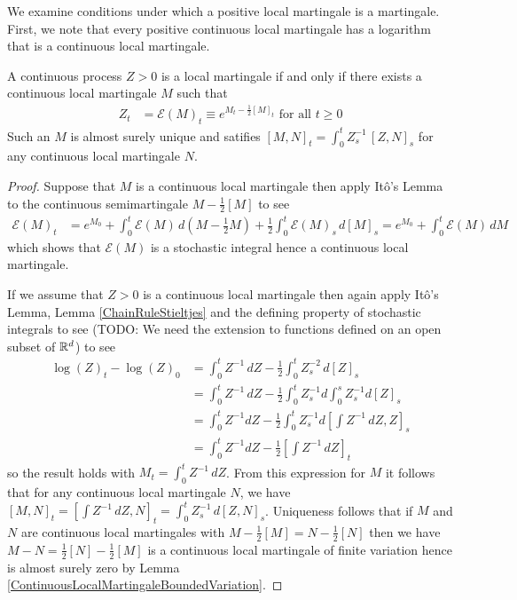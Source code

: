 We examine conditions under which a positive local martingale is a martingale.  First, we note that every positive continuous local martingale has a logarithm that is a continuous local martingale.
\begin{lem}\label{RealExponentialContinuousMartingale}A continuous process $Z > 0$ is a local martingale if and only if there exists a continuous local martingale $M$ such that
\begin{align*}
Z_t &= \mathcal{E}(M)_t \equiv e^{M_t - \frac{1}{2}[M]_t} \text{ for all $t \geq 0$}
\end{align*}
Such an $M$ is almost surely unique and satifies $[M,N]_t = \int_0^t Z^{-1}_s \, [Z,N]_s$ for any continuous local martingale $N$.
\end{lem}
\begin{proof}
Suppose that $M$ is a continuous local martingale then apply It\^{o}'s Lemma to the continuous semimartingale $M - \frac{1}{2}[M]$ to see
\begin{align*}
\mathcal{E}(M)_t &= e^{M_0} + \int_0^t \mathcal{E}(M) \, d(M - \frac{1}{2}M) + \frac{1}{2} \int_0^t \mathcal{E}(M)_s \, d[M]_s =  e^{M_0} + \int_0^t \mathcal{E}(M) \, dM
\end{align*}
which shows that $\mathcal{E}(M)$ is a stochastic integral hence a continuous local martingale.

If we assume that $Z>0$ is a continuous local martingale then again apply It\^{o}'s Lemma, Lemma \ref{ChainRuleStieltjes} and the defining property of stochastic integrals to see (TODO: We need the extension to functions defined on an open subset of $\mathbb{R}^d$) to see
\begin{align*}
\log(Z)_t - \log(Z)_0 &= \int_0^t Z^{-1} \, dZ - \frac{1}{2} \int_0^t Z^{-2}_s \, d[Z]_s \\
&= \int_0^t Z^{-1} \, dZ - \frac{1}{2} \int_0^t Z_s^{-1} d \int_0^s Z_s^{-1} d[Z]_s \\
&= \int_0^t Z^{-1} dZ - \frac{1}{2} \int_0^t Z_s^{-1}  d [ \int Z^{-1} \, dZ, Z]_s \\
&=  \int_0^t Z^{-1} dZ - \frac{1}{2}[ \int Z^{-1} \, dZ]_t
\end{align*}
so the result holds with $M_t = \int_0^t Z^{-1} \, dZ$.  From this expression for $M$ it follows that for any continuous local martingale $N$, we have $[M,N]_t = [\int Z^{-1} \, dZ, N]_t = \int_0^t Z^{-1}_s \, d[Z,N]_s$.  Uniqueness follows that if $M$ and $N$ are continuous local martingales with $M - \frac{1}{2} [M] = N - \frac{1}{2} [N]$ then we have $M -N = \frac{1}{2} [N] - \frac{1}{2} [M]$ is a continuous local martingale of finite variation hence is almost surely zero by Lemma \ref{ContinuousLocalMartingaleBoundedVariation}.
\end{proof}


